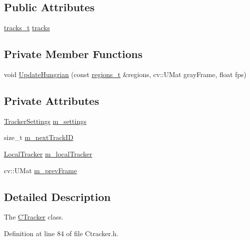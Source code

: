 \subsection*{Public Attributes}
\begin{DoxyCompactItemize}
\item 
\mbox{\hyperlink{track_8h_aaa9881295be74ce8bd6990b9aafaf788}{tracks\+\_\+t}} \mbox{\hyperlink{class_c_tracker_a86d322bc042985711c8d5ec8b9614230}{tracks}}
\end{DoxyCompactItemize}
\subsection*{Private Member Functions}
\begin{DoxyCompactItemize}
\item 
void \mbox{\hyperlink{class_c_tracker_a9fd9223baba528c3c6522241391126ef}{Update\+Hungrian}} (const \mbox{\hyperlink{defines_8h_a01db0de56a20f4342820a093c5154536}{regions\+\_\+t}} \&regions, cv\+::\+U\+Mat gray\+Frame, float fps)
\end{DoxyCompactItemize}
\subsection*{Private Attributes}
\begin{DoxyCompactItemize}
\item 
\mbox{\hyperlink{struct_tracker_settings}{Tracker\+Settings}} \mbox{\hyperlink{class_c_tracker_acb84aee0d550f4cdadbfac6735811050}{m\+\_\+settings}}
\item 
size\+\_\+t \mbox{\hyperlink{class_c_tracker_acaa6995a64483d7666ff2117f1671fed}{m\+\_\+next\+Track\+ID}}
\item 
\mbox{\hyperlink{class_local_tracker}{Local\+Tracker}} \mbox{\hyperlink{class_c_tracker_a0f7f687608e94fb1c1a94f49e7c2c784}{m\+\_\+local\+Tracker}}
\item 
cv\+::\+U\+Mat \mbox{\hyperlink{class_c_tracker_a045ff08d0d83d89a9733657defdc9794}{m\+\_\+prev\+Frame}}
\end{DoxyCompactItemize}


\subsection{Detailed Description}
The \mbox{\hyperlink{class_c_tracker}{C\+Tracker}} class. 

Definition at line 84 of file Ctracker.\+h.



